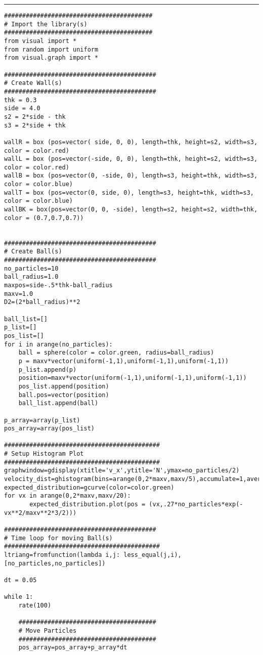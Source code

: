 \documentclass[a4]{article}
\begin{document}
{\color{code}\hrule
\begin{verbatim}
#########################################
# Import the library(s)
#########################################
from visual import *
from random import uniform
from visual.graph import *

##########################################
# Create Wall(s)
##########################################
thk = 0.3
side = 4.0
s2 = 2*side - thk
s3 = 2*side + thk

wallR = box (pos=vector( side, 0, 0), length=thk, height=s2, width=s3, color = color.red)
wallL = box (pos=vector(-side, 0, 0), length=thk, height=s2, width=s3, color = color.red)
wallB = box (pos=vector(0, -side, 0), length=s3, height=thk, width=s3, color = color.blue)
wallT = box (pos=vector(0, side, 0), length=s3, height=thk, width=s3, color = color.blue)
wallBK = box(pos=vector(0, 0, -side), length=s2, height=s2, width=thk, color = (0.7,0.7,0.7))


##########################################
# Create Ball(s)
##########################################
no_particles=10
ball_radius=1.0
maxpos=side-.5*thk-ball_radius
maxv=1.0
D2=(2*ball_radius)**2

ball_list=[]
p_list=[]
pos_list=[]
for i in arange(no_particles):
    ball = sphere(color = color.green, radius=ball_radius)
    p = maxv*vector(uniform(-1,1),uniform(-1,1),uniform(-1,1))
    p_list.append(p)
    position=maxv*vector(uniform(-1,1),uniform(-1,1),uniform(-1,1))
    pos_list.append(position)
    ball.pos=vector(position)
    ball_list.append(ball)

p_array=array(p_list)
pos_array=array(pos_list)

###########################################
# Setup Histogram Plot
###########################################
graphwindow=gdisplay(xtitle='v_x',ytitle='N',ymax=no_particles/2)
velocity_dist=ghistogram(bins=arange(0,2*maxv,maxv/5),accumulate=1,average=1)
expected_distribution=gcurve(color=color.green)
for vx in arange(0,2*maxv,maxv/20):
       expected_distribution.plot(pos = (vx,.27*no_particles*exp(-vx**2/maxv**2*3/2)))

##########################################
# Time loop for moving Ball(s)
###########################################
ltriang=fromfunction(lambda i,j: less_equal(j,i), [no_particles,no_particles])

dt = 0.05

while 1:
    rate(100)

    ######################################
    # Move Particles
    ######################################
    pos_array=pos_array+p_array*dt


\end{verbatim}}
\end{document}

